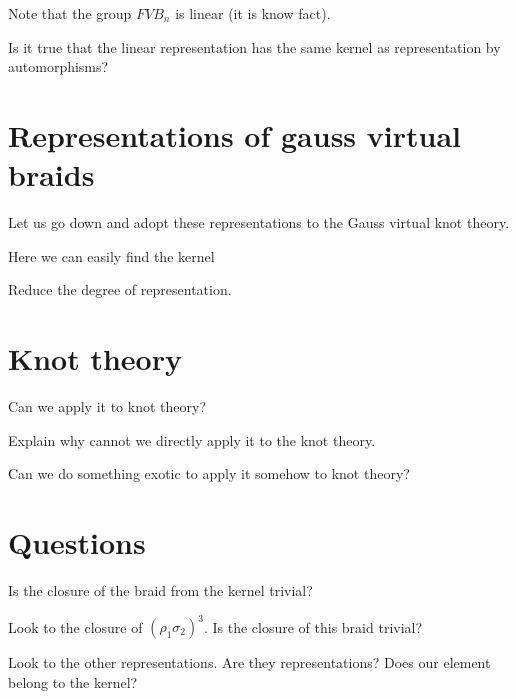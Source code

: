 \documentclass{article}
\begin{document}
Note that the group $FVB_n$ is linear (it is know fact).

Is it true that the linear representation has the same kernel as representation by automorphisms?

\section{Representations of gauss virtual braids}
Let us go down and adopt these representations to the Gauss virtual knot theory.

Here we can easily find the kernel

Reduce the degree of representation.
\section{Knot theory}
Can we apply it to knot theory?

Explain why cannot we directly apply it to the knot theory.

Can we do something exotic to apply it somehow to knot theory?

\section{Questions}
Is the closure of the braid from the kernel trivial?

Look to the closure of $(\rho_1\sigma_2)^3$. Is the closure of this braid trivial?

Look to the other representations. Are they representations? Does our element belong to the kernel?
\end{document}
